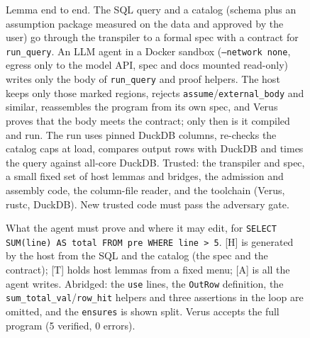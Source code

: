 %
%

\begin{figure}[t]
  \centering
  
  \caption{Lemma end to end. The SQL query and a catalog (schema plus an assumption package measured on
    the data and approved by the user) go through the transpiler to a formal spec with a contract for
    \texttt{run\_query}. An LLM agent in a Docker sandbox (\texttt{--network none}, egress only to the
    model API, spec and docs mounted read-only) writes only the body of \texttt{run\_query} and proof
    helpers. The host keeps only those marked regions, rejects \texttt{assume}/\texttt{external\_body}
    and similar, reassembles the program from its own spec, and Verus proves that the body meets the
    contract; only then is it compiled and run. The run uses pinned DuckDB columns, re-checks the catalog
    caps at load, compares output rows with DuckDB and times the query against all-core DuckDB.
    Trusted: the transpiler and spec, a small fixed set of host lemmas and bridges, the admission and
    assembly code, the column-file reader, and the toolchain (Verus, rustc, DuckDB). New trusted code
    must pass the adversary gate.}
  \label{fig:overview}
\end{figure}

\begin{figure}[t]
  \centering
  
  \caption{What the agent must prove and where it may edit, for
    \texttt{SELECT SUM(line) AS total FROM pre WHERE line > 5}. [H] is generated by the host from the
    SQL and the catalog (the spec and the contract); [T] holds host lemmas from a fixed menu; [A] is
    all the agent writes. Abridged: the \texttt{use} lines, the \texttt{OutRow} definition, the
    \texttt{sum\_total\_val}/\texttt{row\_hit} helpers and three assertions in the loop are omitted, and the
    \texttt{ensures} is shown split. Verus accepts the full program (5 verified, 0 errors).}
  \label{fig:listing}
\end{figure}
